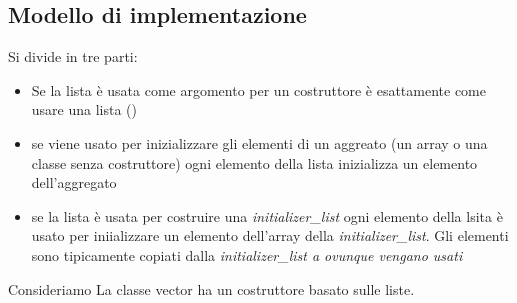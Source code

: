 \documentclass[11pt,a4paper]{book}
\begin{document}
\subsection{Modello di implementazione}
Si divide in tre parti:
\begin{itemize}
	\item Se la lista è usata come argomento per un costruttore è esattamente come usare una lista ()
	\item se viene usato per inizializzare gli elementi di un aggreato (un array o una classe senza costruttore) ogni elemento della lista inizializza un elemento dell'aggregato
	\item se la lista è usata per costruire una \emph{initializer\_list} ogni elemento della lsita è usato per iniializzare un elemento dell'array della \emph{initializer\_list}. Gli elementi sono tipicamente copiati dalla \emph{initializer\_list a ovunque vengano usati}
\end{itemize}

Consideriamo
\label{code: 169}
La classe vector ha un costruttore basato sulle liste.
\end{document}
